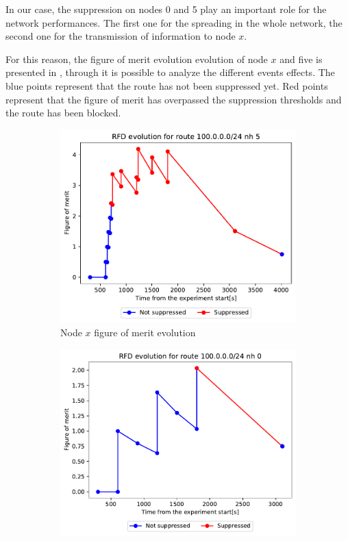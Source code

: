 In our case, the suppression on nodes \num{0} and \num{5} play an important role
for the network performances.
The first one for the spreading in the whole network, the second one for the
transmission of information to node $x$.

For this reason, the figure of merit evolution evolution of node \(x\) and five
is presented in , through it is
possible to analyze the different events effects.
The blue points represent that the route has not been suppressed yet.
Red points represent that the figure of merit has overpassed the suppression
thresholds and the route has been blocked.

\begin{figure}[h]
     \centering
     \begin{subfigure}[b]{0.476\textwidth}
         \centering
         \includegraphics[width=\textwidth]{images/RFD/clique/FigureOfMerit/mrai7_RFD_x_rfd_R1.pdf}
         \caption{Node $x$ figure of merit evolution}
         \label{fig:clique_nodex_30}
     \end{subfigure}
     \hfill
     \begin{subfigure}[b]{0.494\textwidth}
         \centering
         \includegraphics[width=\textwidth]{images/RFD/clique/FigureOfMerit/mrai7_RFD_5_rfd_R4.pdf}

\end{subfigure}
\end{figure}
